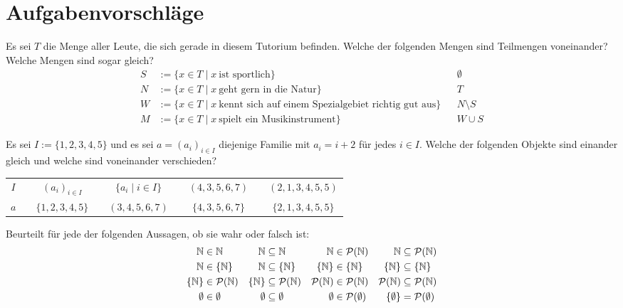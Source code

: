 \clearpage
\section{Aufgabenvorschläge}


\begin{aufg}[Kennenlernen]
    Es sei $T$ die Menge aller Leute, die sich gerade in diesem Tutorium befinden.
    Welche der folgenden Mengen sind Teilmengen voneinander? Welche Mengen sind sogar gleich?
    \begin{align*}
        S&:= \{ x\in T \mid x\ \text{ist sportlich} \}  && \emptyset  \\
        N&:=  \{ x\in T \mid x\ \text{geht gern in die Natur} \} && T \\
        W & := \{ x\in T \mid x\ \text{kennt sich auf einem Spezialgebiet richtig gut aus} \} &&  N\setminus S  \\
        M &:= \{ x \in T \mid x\ \text{spielt ein Musikinstrument} \} && W \cup S
    \end{align*}
\end{aufg}


\begin{aufg}
    Es sei $I:=\{1,2,3,4,5\}$ und es sei $a=(a_i)_{i\in I}$ diejenige Familie mit $a_i=i+2$ für jedes $i\in I$. Welche der folgenden Objekte sind einander gleich und welche sind voneinander verschieden?
    \begin{center}
        {\renewcommand{\arraystretch}{1.6}
        \begin{tabular}{ccccccccc}
            $I$ && $(a_i)_{i\in I}$&& $\{a_i\mid i\in I\}$ && $(4,3,5,6,7)$ && $(2,1,3,4,5,5)$ \\
            $a$ && $\{1,2,3,4,5\}$ && $(3,4,5,6,7)$ && $\{4,3,5,6,7\}$ && $\{2,1,3,4,5,5\}$
	\end{tabular}}
    \end{center}
\end{aufg}


\begin{aufg}
    Beurteilt für jede der folgenden Aussagen, ob sie wahr oder falsch ist:
    \begin{align*}
        \mathbb N&  \in \mathbb N & \mathbb N & \subseteq \mathbb N & \mathbb N & \in \mathcal P(\mathbb N) &  \mathbb N & \subseteq \mathcal P(\mathbb N) \\
        \mathbb N & \in \{ \mathbb N\} & \mathbb N & \subseteq \{ \mathbb N\} & \{ \mathbb N\} & \in \{ \mathbb N\} & \{\mathbb N\} & \subseteq \{ \mathbb N\} \\
        \{\mathbb N\} & \in \mathcal P(\mathbb N) & \{ \mathbb N\} & \subseteq \mathcal P(\mathbb N) & \mathcal P(\mathbb N) & \in \mathcal P(\mathbb N) & \mathcal P(\mathbb N) & \subseteq \mathcal P(\mathbb N) \\
        \emptyset & \in \emptyset & \emptyset &\subseteq \emptyset & \emptyset & \in \mathcal P(\emptyset) & \{\emptyset\} & = \mathcal P(\emptyset)
    \end{align*}
\end{aufg}


